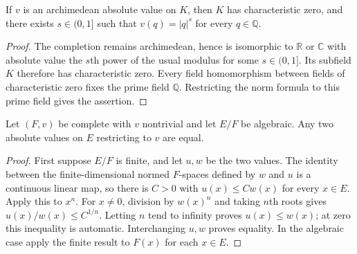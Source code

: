 \begin{lemma}
\label{lem:archimedean-rational-normalization}
\leanok
{}
If $v$ is an archimedean absolute value on $K$, then $K$ has
characteristic zero, and there exists $s\in(0,1]$ such that
$v(q)=|q|^s$ for every $q\in\mathbb Q$.
\end{lemma}
\begin{proof}
The completion remains archimedean, hence is isomorphic to $\mathbb R$
or $\mathbb C$ with absolute value the $s$th power of the usual modulus
for some $s\in(0,1]$. Its subfield $K$ therefore has characteristic zero.
Every field homomorphism between fields of characteristic zero fixes the
prime field $\mathbb Q$. Restricting the norm formula to this prime field
gives the assertion.
\end{proof}

\begin{lemma}
\label{lem:complete-extension-unique}
\leanok
{}
Let $(F,v)$ be complete with $v$ nontrivial and let $E/F$ be algebraic.
Any two absolute values on $E$ restricting to $v$ are equal.
\end{lemma}
\begin{proof}
First suppose $E/F$ is finite, and let $u,w$ be the two values.
The identity between the finite-dimensional normed $F$-spaces defined
by $w$ and $u$ is a continuous linear map, so there is $C>0$ with
$u(x)\leq Cw(x)$ for every $x\in E$. Apply this to $x^n$.
For $x\ne0$, division by $w(x)^n$ and taking $n$th roots gives
$u(x)/w(x)\leq C^{1/n}$. Letting $n$ tend to infinity proves
$u(x)\leq w(x)$; at zero this inequality is automatic.
Interchanging $u,w$ proves equality. In the algebraic case apply
the finite result to $F(x)$ for each $x\in E$.
\end{proof}

